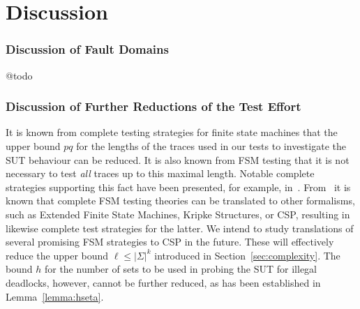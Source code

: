 \section{Discussion}
\label{sec:conc}
\subsubsection*{Discussion of Fault Domains}

@todo


\subsubsection*{Discussion of Further Reductions of the Test Effort}
It is known from complete testing strategies for finite state machines that 
the upper bound $pq$ for the lengths of the 
traces used in our tests to investigate the SUT behaviour can be reduced. It is also
known from FSM testing that it is not necessary to test {\it all} traces up to this maximal length. Notable complete 
strategies supporting this fact have been presented, for example,
 in~\cite{hierons_testing_2004,DBLP:conf/forte/DorofeevaEY05,petrenko_testing_2011,simao_reducing_2012}. From~\cite{Huang2017} it
 is known that complete 
 FSM testing theories can be translated to other formalisms, such as 
Extended Finite State Machines, Kripke Structures, or CSP, resulting in likewise complete
test strategies for the latter. We intend to study translations of several promising FSM
strategies to CSP in the future. These will effectively reduce the upper bound 
$\ell\le |\Sigma|^k$ introduced in Section~\ref{sec:complexity}. The bound $h$ for
the number of sets to be used in probing the SUT for illegal deadlocks, however, cannot be further reduced, as has been established in Lemma~\ref{lemma:hseta}.


